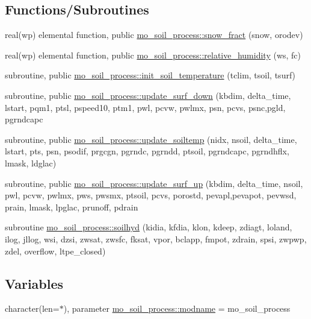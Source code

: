 \subsection*{Functions/\+Subroutines}
\begin{DoxyCompactItemize}
\item 
real(wp) elemental function, public \hyperlink{namespacemo__soil__process_a20c4b80ccc8a10cb3028ff15293d3cc0}{mo\+\_\+soil\+\_\+process\+::snow\+\_\+fract} (snow, orodev)
\item 
real(wp) elemental function, public \hyperlink{namespacemo__soil__process_ae91447aa4654c4a406dedd04c5c4daf0}{mo\+\_\+soil\+\_\+process\+::relative\+\_\+humidity} (ws, fc)
\item 
subroutine, public \hyperlink{namespacemo__soil__process_aefac72c5fad9c92d8fa6c646fcd13f3b}{mo\+\_\+soil\+\_\+process\+::init\+\_\+soil\+\_\+temperature} (tclim, tsoil, tsurf)
\item 
subroutine, public \hyperlink{namespacemo__soil__process_a7dd6c425ac02aef924fb1fa3de6b373d}{mo\+\_\+soil\+\_\+process\+::update\+\_\+surf\+\_\+down} (kbdim, delta\+\_\+time, lstart, pqm1, ptsl, pspeed10, ptm1, pwl, pcvw, pwlmx, psn, pcvs, psnc,pgld, pgrndcapc
\item 
subroutine, public \hyperlink{namespacemo__soil__process_a9f2a04bdb962c1615ee419e1c62d6870}{mo\+\_\+soil\+\_\+process\+::update\+\_\+soiltemp} (nidx, nsoil, delta\+\_\+time, lstart, pts, psn, psodif, prgcgn, pgrndc, pgrndd, ptsoil, pgrndcapc, pgrndhflx, lmask, ldglac)
\item 
subroutine, public \hyperlink{namespacemo__soil__process_a6baae437b29f7d04d8bb10cb1d52249f}{mo\+\_\+soil\+\_\+process\+::update\+\_\+surf\+\_\+up} (kbdim, delta\+\_\+time, nsoil, pwl, pcvw, pwlmx, pws, pwsmx, ptsoil, pcvs, porostd, pevapl,pevapot, pevwsd, prain, lmask, lpglac, prunoff, pdrain
\item 
subroutine \hyperlink{namespacemo__soil__process_a4063fcd30b65b8bb38b532cfe884feb7}{mo\+\_\+soil\+\_\+process\+::soilhyd} (kidia, kfdia, klon, kdeep, zdiagt, loland, ilog, jllog, wsi, dzsi, zwsat, zwsfc, fksat, vpor, bclapp, fmpot, zdrain, spsi, zwpwp, zdel, overflow, ltpe\+\_\+closed)
\end{DoxyCompactItemize}
\subsection*{Variables}
\begin{DoxyCompactItemize}
\item 
character(len=$\ast$), parameter \hyperlink{namespacemo__soil__process_ad7dacf511801f2d14d39a64fe6bfe6d2}{mo\+\_\+soil\+\_\+process\+::modname} = \textquotesingle{}mo\+\_\+soil\+\_\+process\textquotesingle{}
\end{DoxyCompactItemize}
